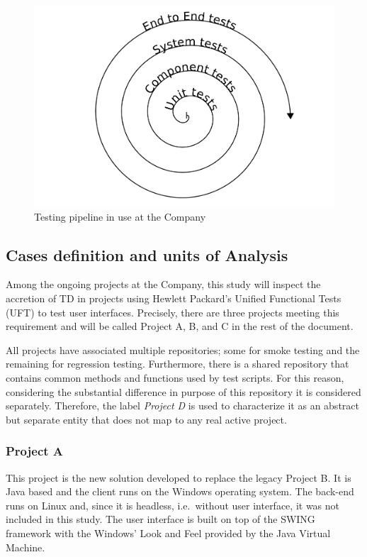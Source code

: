 \begin{figure}[hbt]
    \centering
    \includegraphics[width=\textwidth]{figure/testing_pipeline.pdf}
    \caption{Testing pipeline in use at the Company}
    \label{fig:testing_pipeline}
\end{figure}

\subsection{Cases definition and units of Analysis} \label{sec:cases_definition}

Among the ongoing projects at the Company, this study will inspect the accretion of TD in projects using Hewlett Packard's Unified Functional Tests (UFT) to test user interfaces. Precisely, there are three projects meeting this requirement and will be called Project A, B, and C in the rest of the document.

All projects have associated multiple repositories; some for smoke testing and the remaining for regression testing. Furthermore, there is a shared repository that contains common methods and functions used by test scripts. For this reason, considering the substantial difference in purpose of this repository it is considered separately. Therefore, the label \textit{Project D} is used to characterize it as an abstract but separate entity that does not map to any real active project.


\subsubsection{Project A}
This project is the new solution developed to replace the legacy Project B. It is Java based and the client runs on the Windows operating system. The back-end runs on Linux and, since it is headless, i.e.\ without user interface, it was not included in this study. The user interface is built on top of the SWING framework with the Windows' Look and Feel provided by the Java Virtual Machine.

